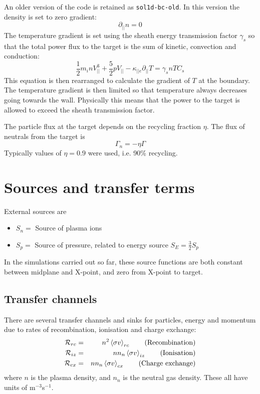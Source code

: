 \documentclass[12pt,a4paper]{article}
\begin{document}
An older version of the code is retained as \texttt{sol1d-bc-old}. In this version the density is set to zero gradient:
\[
\partial_{||}n = 0
\]
The temperature gradient is set using the sheath energy transmission factor $\gamma_s$ so 
that the total power flux to the target is the sum of kinetic, convection and conduction:
\begin{equation}
\frac{1}{2}m_inV_{||}^3  + \frac{5}{2}pV_{||} - \kappa_{||e}\partial_{||}T = \gamma_s nTC_s
\end{equation}
This equation is then rearranged to calculate the gradient of $T$ at the boundary. 
The temperature gradient is then limited so that temperature always decreases going
towards the wall. Physically this means that the power to the target is allowed to exceed the sheath
transmission factor.

The particle flux at the target depends on the recycling fraction $\eta$. The flux of neutrals from
the target is 
\[
\Gamma_n = -\eta \Gamma
\]
Typically values of $\eta = 0.9$ were used, i.e. 90\% recycling. 


\section{Sources and transfer terms}

External sources are
\begin{itemize}
\item $S_n = $ Source of plasma ions
\item $S_p = $ Source of pressure, related to energy source $S_E = \frac{3}{2}S_p$
\end{itemize}
In the simulations carried out so far, these source functions are both constant between midplane and X-point, and zero
from X-point to target.

\subsection{Transfer channels}

There are several transfer channels and sinks for particles, energy and momentum due to rates
of recombination, ionisation and charge exchange:
\begin{eqnarray*}
  \mathcal{R}_{rc} &=& n^2\left<\sigma v\right>_{rc}   \qquad \mbox{\textrm{(Recombination)}} \\
  \mathcal{R}_{iz} &=&  nn_n\left<\sigma v\right>_{iz} \qquad \mbox{\textrm{(Ionisation)}} \\
  \mathcal{R}_{cx} &=& nn_n\left<\sigma v\right>_{cx} \qquad \mbox{\textrm{(Charge exchange)}}
\end{eqnarray*}
where $n$ is the plasma density, and $n_n$ is the neutral gas density. These all have units of m$^{-3}$s$^{-1}$.
\end{document}
